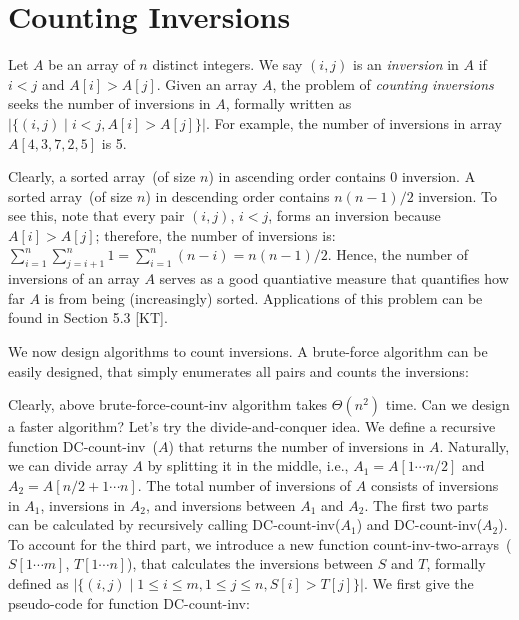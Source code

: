 \setcounter{definition}{0} \setcounter{property}{0} \setcounter{claim}{0} \setcounter{fact}{0} \setcounter{corollary}{0} \setcounter{figure}{0}

\section{Counting Inversions}

Let $A$ be an array of $n$ distinct integers.
We say $(i,j)$ is an \emph{inversion} in $A$ if $i < j$ and $A[i] > A[j]$.
Given an array $A$, the problem of \emph{counting inversions} seeks the
number of inversions in $A$, formally written as $|\{(i,j)\mid i<j, A[i]>A[j]\}|$.
For example, the number of inversions in array $A[4, 3, 7, 2, 5]$ is 5.

Clearly, a sorted array~(of size $n$) in ascending order contains 0 inversion.
A sorted array~(of size $n$) in descending order contains $n(n-1)/2$ inversion.
To see this, note that every pair $(i,j)$, $i<j$, forms an inversion because 
$A[i] > A[j]$; therefore, the number of inversions is: $\sum_{i=1}^n \sum_{j=i+1}^n 1 = \sum_{i=1}^n (n-i) = n(n-1)/2$.
Hence, the number of inversions of an array $A$ serves as a good quantiative measure
that quantifies how far $A$ is from being (increasingly) sorted.
Applications of this problem can be found in Section 5.3 [KT].

We now design algorithms to count inversions.
A brute-force algorithm can be easily designed, that simply
enumerates all pairs and counts the inversions:


\begin{minipage}{0.8\textwidth}
	\xxx
	\xxx
	\xxx
	\xxx
	\xxx
	\xxx
	\xxx
	\xxx
	\xxx
\end{minipage}

Clearly, above brute-force-count-inv algorithm takes $\Theta(n^2)$ time. Can we design a faster algorithm?
Let's try the divide-and-conquer idea. We define a recursive function DC-count-inv~($A$) that returns the number
of inversions in $A$.
Naturally, we can divide array $A$ by splitting it in the middle, i.e., $A_1 = A[1\cdots n/2]$
and $A_2 = A[n/2 + 1 \cdots n]$. The total number of inversions of $A$ consists of inversions in $A_1$, inversions
in $A_2$, and inversions between $A_1$ and $A_2$. The first two parts can be calculated by recursively
calling DC-count-inv($A_1$) and DC-count-inv($A_2$). To account for the third part,
we introduce a new function count-inv-two-arrays~($S[1\cdots m]$, $T[1\cdots n]$), that calculates the
inversions between $S$ and $T$, formally defined as $|\{(i,j)\mid 1\le i \le m, 1\le j \le n, S[i]> T[j]\}|$.
We first give the pseudo-code for function DC-count-inv:

